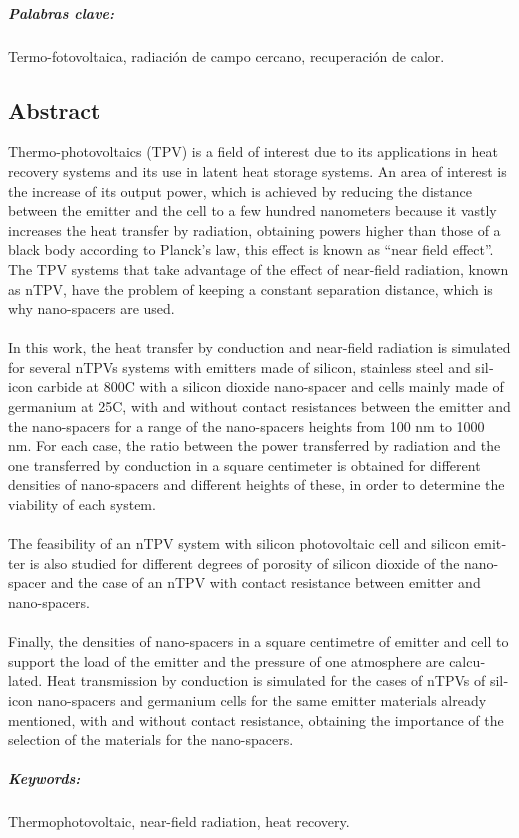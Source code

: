 \paragraph{Palabras clave:} Termo-fotovoltaica, radiación de campo cercano, recuperación de calor.
\begin{otherlanguage}{british}
\chapter{Abstract}

Thermo-photovoltaics (TPV) is a field of interest due to its applications in heat recovery systems and its use in latent heat storage systems. An area of interest is the increase of its output power, which is achieved by reducing the distance between the emitter and the cell to a few hundred nanometers because it vastly increases the heat transfer by radiation, obtaining powers higher than those of a 
black body according to Planck's law, this effect is known as ``near field effect''. The TPV systems that take advantage of the effect of near-field radiation, known as nTPV, have the problem of keeping a constant separation distance, which is why nano-spacers are used.\\\\
%
In this work, the heat transfer by conduction and near-field radiation is simulated for several nTPVs systems with emitters made of silicon, stainless steel and silicon carbide at 800\textdegree C with a silicon dioxide nano-spacer and cells mainly made of germanium at 25\textdegree C, with and without contact resistances between the emitter and the nano-spacers for a range of the nano-spacers heights from 100 nm to 1000 nm. For each case, the ratio between the power transferred by radiation and the one transferred by conduction in a square centimeter is obtained for different densities of nano-spacers and different heights of these, in order to determine the viability of each system.\\\\
%
The feasibility of an nTPV system with silicon photovoltaic cell and silicon emitter is also studied for different degrees of porosity of silicon dioxide of the nano-spacer and the case of an nTPV with contact resistance between emitter and nano-spacers.\\\\
%
Finally, the densities of nano-spacers in a square centimetre of emitter and cell to support the load of the emitter and the pressure of one atmosphere are calculated. Heat transmission by conduction is simulated for the cases of nTPVs of silicon nano-spacers and germanium cells for the same emitter materials already mentioned, with and without contact resistance, obtaining the importance of the selection of the materials for the nano-spacers.

\paragraph{Keywords:} Thermophotovoltaic, near-field radiation, heat recovery.
\end{otherlanguage}